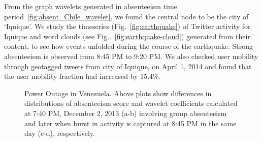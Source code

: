 \documentclass[conference]{IEEEtran}
\begin{document}
From the graph wavelets generated in absenteeism time period~\ref{fig:absent_Chile_wavelet}, we found the central node to be the city of `Iquique'.
We study the timeseries (Fig.~\ref{fig:earthquake}) of Twitter activity for Iquique and word clouds (see Fig..~\ref{fig:earthquake-cloud}) generated from their content, to see how events unfolded during the course of the earthquake.
Strong absenteeism is observed from 8:45 PM to 9:20 PM. We also checked  user mobility through geotagged tweets from city of Iquique, on April 1, 2014 and found that the user mobility fraction had increased by 15.4\%.

\begin{figure}[t]
	\centering
	\caption{Power Outage in Venezuela. Above plots show differences in distributions of absenteeism score and wavelet coefficients calculated at 7:40 PM, December 2, 2013 (a-b) involving group absenteeism and later when burst in activity is captured at 8:45 PM in the same day (c-d), respectively.}
\label{fig:case2_wavelet}
\end{figure}
\end{document}
